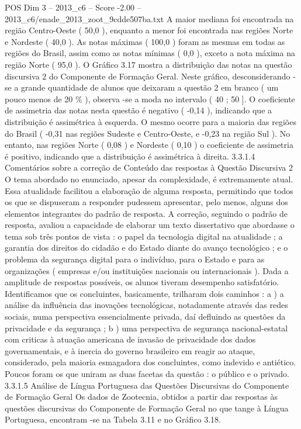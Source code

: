 \begin{textsample}{POS Dim 3 – 2013\_c6 – Score -2.00 – 2013\_c6/enade\_2013\_zoot\_9cdde507ba.txt}
A maior mediana foi encontrada na região Centro-Oeste ( 50,0 ), enquanto a menor foi encontrada nas regiões Norte e Nordeste ( 40,0 ).
As notas máximas ( 100,0 ) foram as mesmas em todas as regiões do Brasil, assim como as notas mínimas ( 0,0 ), exceto a nota máxima na região Norte ( 95,0 ).
O Gráfico 3.17 mostra a distribuição das notas na questão discursiva 2 do Componente de Formação Geral.
Neste gráfico, desconsiderando -se a grande quantidade de alunos que deixaram a questão 2 em branco ( um pouco menos de 20 \% ), observa -se a moda no intervalo ( 40 ; 50 ].
O coeficiente de assimetria das notas nesta questão é negativo ( -0,14 ), indicando que a distribuição é assimétrica à esquerda.
O mesmo ocorre para a maioria das regiões do Brasil ( -0,31 nas regiões Sudeste e Centro-Oeste, e -0,23 na região Sul ).
No entanto, nas regiões Norte ( 0,08 ) e Nordeste ( 0,10 ) o coeficiente de assimetria é positivo, indicando que a distribuição é assimétrica à direita. 3.3.1.4 Comentários sobre a correção de Conteúdo das respostas à Questão Discursiva 2 O tema abordado no enunciado, apesar da complexidade, é extremamente atual.
Essa atualidade facilitou a elaboração de alguma resposta, permitindo que todos os que se dispuseram a responder pudessem apresentar, pelo menos, alguns dos elementos integrantes do padrão de resposta.
A correção, seguindo o padrão de resposta, avaliou a capacidade de elaborar um texto dissertativo que abordasse o tema sob três pontos de vista : o papel da tecnologia digital na atualidade ; a garantia dos direitos do cidadão e do Estado diante do avanço tecnológico ; e o problema da segurança digital para o indivíduo, para o Estado e para as organizações ( empresas e/ou instituições nacionais ou internacionais ).
Dada a amplitude de respostas possíveis, os alunos tiveram desempenho satisfatório.
Identificamos que os concluintes, basicamente, trilharam dois caminhos : a ) a análise da influência das inovações tecnológicas, notadamente através das redes sociais, numa perspectiva essencialmente privada, daí defluindo as questões da privacidade e da segurança ; b ) uma perspectiva de segurança nacional-estatal com criticas à atuação americana de invasão de privacidade dos dados governamentais, e à inercia do governo brasileiro em reagir ao ataque, considerado, pela maioria esmagadora dos concluintes, como indevido e antiético.
Poucos foram os que uniram as duas facetas da questão : o público e o privado. 3.3.1.5 Análise de Língua Portuguesa das Questões Discursivas do Componente de Formação Geral Os dados de Zootecnia, obtidos a partir das respostas às questões discursivas do Componente de Formação Geral no que tange à Língua Portuguesa, encontram -se na Tabela 3.11 e no Gráfico 3.18.

\end{textsample}
